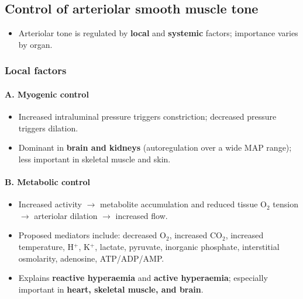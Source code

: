 \documentclass[11pt,a4paper]{article}
\begin{document}
\subsection{Control of arteriolar smooth muscle tone}
\begin{itemize}
\item Arteriolar tone is regulated by \textbf{local} and \textbf{systemic} factors; importance varies by organ.
\end{itemize}

\subsubsection{Local factors}

\paragraph{A. Myogenic control}
\begin{itemize}
\item Increased intraluminal pressure triggers constriction; decreased pressure triggers dilation.
\item Dominant in \textbf{brain and kidneys} (autoregulation over a wide MAP range); less important in skeletal muscle and skin.
\end{itemize}

\paragraph{B. Metabolic control}
\begin{itemize}
\item Increased activity $\rightarrow$ metabolite accumulation and reduced tissue O$_2$ tension $\rightarrow$ arteriolar dilation $\rightarrow$ increased flow.
\item Proposed mediators include: decreased O$_2$, increased CO$_2$, increased temperature, H$^+$, K$^+$, lactate, pyruvate, inorganic phosphate, interstitial osmolarity, adenosine, ATP/ADP/AMP.
\item Explains \textbf{reactive hyperaemia} and \textbf{active hyperaemia}; especially important in \textbf{heart, skeletal muscle, and brain}.
\end{itemize}
\end{document}
